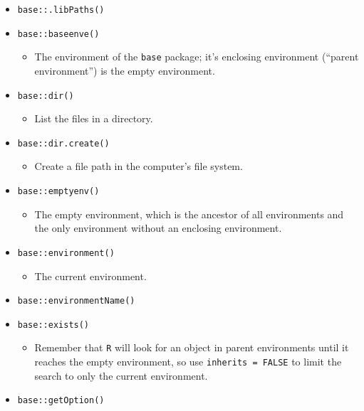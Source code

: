 \documentclass[
]{book}
\providecommand{\tightlist}{%
  \setlength{\itemsep}{0pt}\setlength{\parskip}{0pt}}
\begin{document}
\begin{itemize}
\tightlist
\item
  \texttt{base::.libPaths()}
\item
  \texttt{base::baseenve()}

  \begin{itemize}
  \tightlist
  \item
    The environment of the \texttt{base} package; it's enclosing environment (``parent environment'') is the empty environment.
  \end{itemize}
\item
  \texttt{base::dir()}

  \begin{itemize}
  \tightlist
  \item
    List the files in a directory.
  \end{itemize}
\item
  \texttt{base::dir.create()}

  \begin{itemize}
  \tightlist
  \item
    Create a file path in the computer's file system.
  \end{itemize}
\item
  \texttt{base::emptyenv()}

  \begin{itemize}
  \tightlist
  \item
    The empty environment, which is the ancestor of all environments and the only environment without an enclosing environment.
  \end{itemize}
\item
  \texttt{base::environment()}

  \begin{itemize}
  \tightlist
  \item
    The current environment.
  \end{itemize}
\item
  \texttt{base::environmentName()}
\item
  \texttt{base::exists()}

  \begin{itemize}
  \tightlist
  \item
    Remember that \texttt{R} will look for an object in parent environments until it reaches the empty environment, so use \texttt{inherits\ =\ FALSE} to limit the search to only the current environment.
  \end{itemize}
\item
  \texttt{base::getOption()}


\end{itemize}
\end{document}
